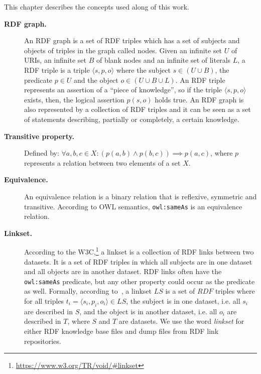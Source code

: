 This chapter describes the concepts used along of this work.

\begin{description}
\item[\textbf{RDF graph.}] An RDF graph is a set of RDF triples which has a set of subjects and objects of triples in the graph called nodes.
Given an infinite set $U$ of URIs, an infinite set $B$ of blank nodes and an infinite set of literals $L$, a RDF triple is a triple $\langle s, p, o \rangle$ where the subject $s \in (U \cup B)$, the predicate $p \in U$ and the object $o \in (U \cup B \cup L)$. An RDF triple represents an assertion of a ``piece of knowledge'', so if the triple $\langle s, p, o \rangle$ exists, then,  the logical assertion $p(s,o)$ holds true.
An RDF graph is also represented by a collection of RDF triples and it can be seen as a set of statements describing, partially or completely, a certain knowledge.

\item[\textbf{Transitive property.}] Defined by: $\forall a,b,c \in X: (p(a,b) \wedge p(b,c)) \implies p(a,c)$, where $p$ represents a relation between two elements of a set $X$.


\item[\textbf{Equivalence.}] An equivalence relation is a binary relation that is reflexive, symmetric and transitive. According to OWL semantics, \texttt{owl:sameAs} is an equivalence relation.

\item[\textbf{Linkset.}]
According to the W3C,\footnote{\url{https://www.w3.org/TR/void/\#linkset}} a linkset is a collection of RDF links between two datasets. It is a set of RDF triples in which all subjects are in one dataset and all objects are in another dataset. RDF links often have the \texttt{owl:sameAs} predicate, but any other property could occur as the predicate as well.
Formally, according to~\cite{alexander2009describing}, a linkset $LS$ is a set of $RDF$ triples where for all triples $t_i =  \langle s_i, p_i, o_i \rangle \in LS$,  the subject is in one dataset,  i.e. all $s_i$ are described in $S$, and the object is in another dataset, i.e. all $o_i$ are described in $T$, where $S$ and $T$ are datasets.
We use the word \emph{linkset} for either RDF knowledge base files and dump files from RDF link repositories.


\end{description}
